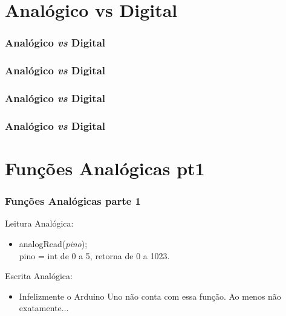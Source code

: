 \documentclass{beamer}
\begin{document}
\section{Analógico vs Digital}
\begin{frame}
	\frametitle{Analógico \textit{vs} Digital}
	\begin{center}
	\end{center}
\end{frame}

\begin{frame}
	\frametitle{Analógico \textit{vs} Digital}
	\begin{center}
	\end{center}
\end{frame}

\begin{frame}
	\frametitle{Analógico \textit{vs} Digital}
	\begin{center}
	\end{center}
\end{frame}

\begin{frame}
	\frametitle{Analógico \textit{vs} Digital}
	\begin{center}
	\end{center}
\end{frame}

\section{Funções Analógicas pt1}
\begin{frame}
	\frametitle{Funções Analógicas parte 1}
	Leitura Analógica:
	\begin{itemize}
		\item analogRead(\textit{pino});\\
		pino = int de 0 a 5, retorna de 0 a 1023.
	\end{itemize}
	Escrita Analógica:
	\begin{itemize}
		\item Infelizmente o Arduino Uno não conta com essa função. Ao menos não exatamente...
	\end{itemize}
\end{frame}
\end{document}
